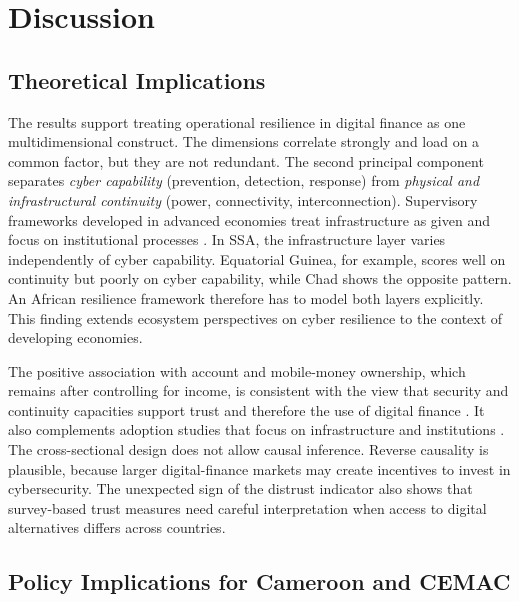 \documentclass[fintech,article,submit,pdftex,moreauthors]{Definitions/mdpi}
\begin{document}
\section{Discussion}\label{sec:discussion}

\subsection{Theoretical Implications}

The results support treating operational resilience in digital finance as one multidimensional construct. The dimensions correlate strongly and load on a common factor, but they are not redundant. The second principal component separates \emph{cyber capability} (prevention, detection, response) from \emph{physical and infrastructural continuity} (power, connectivity, interconnection). Supervisory frameworks developed in advanced economies treat infrastructure as given and focus on institutional processes \citep{BCBS2021,EU2022DORA}. In SSA, the infrastructure layer varies independently of cyber capability. Equatorial Guinea, for example, scores well on continuity but poorly on cyber capability, while Chad shows the opposite pattern. An African resilience framework therefore has to model both layers explicitly. This finding extends ecosystem perspectives on cyber resilience \citep{Dupont2019,Linkov2018} to the context of developing economies.

The positive association with account and mobile-money ownership, which remains after controlling for income, is consistent with the view that security and continuity capacities support trust and therefore the use of digital finance \citep{Cao2018,Mvogo2026}. It also complements adoption studies that focus on infrastructure and institutions \citep{Mothobi2017,Lashitew2019}. The cross-sectional design does not allow causal inference. Reverse causality is plausible, because larger digital-finance markets may create incentives to invest in cybersecurity. The unexpected sign of the distrust indicator also shows that survey-based trust measures need careful interpretation when access to digital alternatives differs across countries.

\subsection{Policy Implications for Cameroon and CEMAC}
\end{document}
